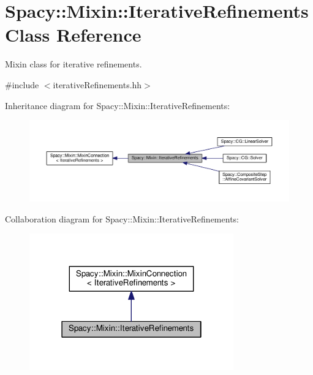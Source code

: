 \hypertarget{classSpacy_1_1Mixin_1_1IterativeRefinements}{}\section{Spacy\+:\+:Mixin\+:\+:Iterative\+Refinements Class Reference}
\label{classSpacy_1_1Mixin_1_1IterativeRefinements}


Mixin class for iterative refinements.  




{\ttfamily \#include $<$iterative\+Refinements.\+hh$>$}



Inheritance diagram for Spacy\+:\+:Mixin\+:\+:Iterative\+Refinements\+:\nopagebreak
\begin{figure}[H]
\begin{center}
\leavevmode
\includegraphics[width=350pt]{classSpacy_1_1Mixin_1_1IterativeRefinements__inherit__graph}
\end{center}
\end{figure}


Collaboration diagram for Spacy\+:\+:Mixin\+:\+:Iterative\+Refinements\+:\nopagebreak
\begin{figure}[H]
\begin{center}
\leavevmode
\includegraphics[width=250pt]{classSpacy_1_1Mixin_1_1IterativeRefinements__coll__graph}
\end{center}
\end{figure}

